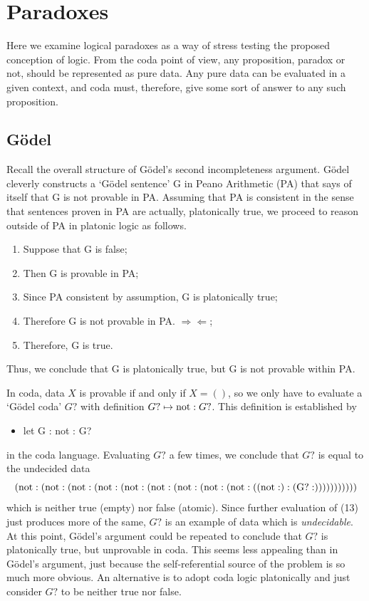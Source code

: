 \documentclass[11pt]{article}
\begin{document}
\section{Paradoxes}

     Here we examine logical paradoxes as a way of stress testing the proposed conception of logic.  
From the coda point of view, any proposition, paradox or not, should be represented as pure data. 
Any pure data can be evaluated in a given context, and coda must, therefore, give some sort of answer 
to any such proposition. 

\subsection{G\"{o}del}

Recall the overall structure of G\"{o}del's second incompleteness argument.  G\"{o}del cleverly constructs a `G\"{o}del sentence' G  
in Peano Arithmetic (PA) that says of itself that G is not provable in PA.  Assuming that PA is consistent in the sense  
that sentences proven in PA are actually, platonically true, we proceed to reason outside of PA in platonic logic as follows. 
\begin{enumerate}
\item Suppose that G is false;
\item Then G is provable in PA;
\item Since PA consistent by assumption, G is platonically true; 
\item Therefore G is not provable in PA.  $\Rightarrow\!\Leftarrow$;
\item Therefore, G is true. 
\end{enumerate}
Thus, we conclude that G is platonically true, but G is not provable within PA.  

In coda, data $X$ is provable if and only if $X=()$, so we only have to evaluate a `G\"{o}del coda' $G?$ 
with definition $G?\mapsto {\rm not}:G?$.   This definition is established by 
\begin{itemize}
\item let G : not : G? 
\end{itemize}
in the coda language. 
Evaluating $G?$ a few times, we conclude that $G?$ is equal to the undecided data 
\begin{equation}\label{eqn} 
{\rm (not:(not:(not:(not:(not:(not:(not:(not:(not:(({not}:):({G?}:)))))))))))}
\end{equation} 
which is neither true (empty) nor false (atomic).  
Since further evaluation of (13) just produces more of the same, $G?$ is an example of data which is {\it undecidable}.   At this point, 
G\"{o}del's argument could be repeated to conclude that $G?$ is platonically true, but unprovable in coda.  This seems less 
appealing than in G\"odel's argument, just because the self-referential source of the problem is so much more obvious.  An alternative 
is to adopt coda logic platonically and just consider $G?$ to be neither true nor false.   
\end{document}
